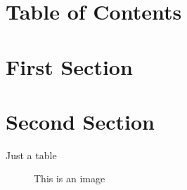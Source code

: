 \documentclass{article}
\begin{document}
\tableofcontents

\section*{Table of Contents}
\section{First Section}
\section{Second Section}

\begin{table}[bp]
    \caption{Just a table}
\end{table}

\begin{figure}[bp]
    \caption{This is an image}
\end{figure}

\begin{appendix}
  \listoftables
  \listoffigures
\end{appendix}
\end{document}
